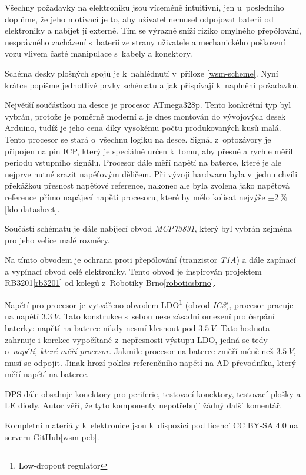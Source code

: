 Všechny požadavky na elektroniku jsou víceméně intuitivní, jen u~posledního
doplňme, že jeho motivací je to, aby uživatel nemusel odpojovat baterii od
elektroniky a nabíjet jí externě. Tím se výrazně sníží riziko omylného
přepólování, nesprávného zacházení s~baterií ze strany uživatele a mechanického
poškození vozu vlivem časté manipulace s~kabely a konektory.

Schéma desky plošných spojů je k~nahlédnutí v~příloze \ref{wsm-scheme}. Nyní
krátce popišme jednotlivé prvky schématu a jak přispívají k~naplnění požadavků.

Největší součástkou na desce je procesor ATmega328p. Tento konkrétní typ byl
vybrán, protože je poměrně moderní a je dnes montován do vývojových desek
Arduino, tudíž je jeho cena díky vysokému počtu produkovaných kusů malá.
Tento procesor se stará o~všechnu logiku na desce. Signál z~optozávory je
připojen na pin ICP, který je speciálně určen k~tomu, aby přesně a rychle měřil
periodu vstupního signálu. Procesor dále měří napětí na baterce, které je ale
nejprve nutné srazit napěťovým děličem. Při vývoji hardwaru byla v~jednu chvíli
překážkou přesnost napěťové reference, nakonec ale byla zvolena jako napěťová
reference přímo napájecí napětí procesoru, které by mělo kolísat nejvýše $\pm 2\ \%$
\ref{ldo-datasheet}.

Součástí schématu je dále nabíjecí obvod \textit{MCP73831}, který byl vybrán
zejména pro jeho velice malé rozměry.

Na tímto obvodem je ochrana proti přepólování (tranzistor \textit{T1A}) a dále
zapínací a vypínací obvod celé elektroniky. Tento obvod je inspirován projektem
RB3201\ref{rb3201} od kolegů z~Robotiky Brno\ref{roboticsbrno}.

Napětí pro procesor je vytvářeno obvodem LDO\footnote{Low-dropout regulator}
(obvod \textit{IC3}), procesor pracuje na napětí $3.3\ V$. Tato konstrukce
s~sebou nese zásadní omezení pro čerpání baterky: napětí na baterce nikdy nesmí
klesnout pod $3.5\ V$. Tato hodnota zahrnuje i korekce vypočítané z~nepřesnosti
výstupu LDO, jedná se tedy o~\textit{napětí, které měří procesor}. Jakmile
procesor na baterce změří méně než $3.5\ V$, musí se odpojit. Jinak hrozí
pokles referenčního napětí na AD převodníku, který měří napětí na baterce.

DPS dále obsahuje konektory pro periferie, testovací konektory, testovací
plošky a LE diody. Autor věří, že tyto komponenty nepotřebují žádný další
komentář.

Kompletní materiály k~elektronice jsou k~dispozici pod licencí CC BY-SA 4.0 na
serveru GitHub\ref{wsm-pcb}.

